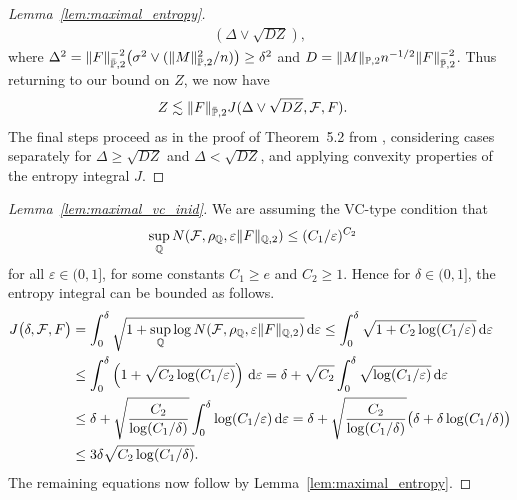 \begin{proof}[Lemma~\ref{lem:maximal_entropy}]
\begin{align*}
    \left( \Delta \vee \sqrt{DZ} \right),
  \end{align*}
  where
  $\Delta^2 = \|F\|_{\bar\P,2}^{-2}
  \big(\sigma^2 \vee (\|M\|_{\P,2}^2 / n) \big) \geq \delta^2$
  and
  $D = \|M\|_{\P,2} n^{-1/2} \|F\|_{\bar\P,2}^{-2}$.
  Thus returning to our bound on $Z$,
  we now have
  \begin{align*}
    Z
    &\lesssim
    \|F\|_{\bar\P,2}
    J(\Delta \vee \sqrt{DZ}, \cF, F).
  \end{align*}
  The final steps proceed as
  in the proof of Theorem~5.2
  from \citet{chernozhukov2014gaussian},
  considering cases separately for
  $\Delta \geq \sqrt{DZ}$
  and
  $\Delta < \sqrt{DZ}$,
  and applying convexity properties of
  the entropy integral $J$.
\end{proof}

\begin{proof}[Lemma~\ref{lem:maximal_vc_inid}]

  We are assuming the VC-type condition that
  \begin{align*}
    \sup_\Q N(\cF, \rho_\Q, \varepsilon \|F\|_{\Q,2})
    &\leq
    (C_1/\varepsilon)^{C_2}
  \end{align*}
  for all $\varepsilon \in (0,1]$,
  for some constants
  $C_1 \geq e$
  and $C_2 \geq 1$.
  Hence for $\delta \in (0,1]$,
  the entropy integral can be bounded as follows.
  \begin{align*}
    J\big(\delta, \cF, F\big)
    &=
    \int_0^\delta
    \sqrt{1 +
    \sup_\Q \log N(\cF, \rho_\Q, \varepsilon \|F\|_{\Q,2})}
    \diff{\varepsilon}
    \leq
    \int_0^\delta
    \sqrt{1 +
      C_2 \log (C_1/\varepsilon)}
    \diff{\varepsilon} \\
    &\leq
    \int_0^\delta
    \left(
      1 +
      \sqrt{C_2 \log (C_1/\varepsilon)}
    \right)
    \diff{\varepsilon}
    =
    \delta
    + \sqrt{C_2}
    \int_0^\delta
    \sqrt{\log (C_1/\varepsilon)}
    \diff{\varepsilon} \\
    &\leq
    \delta
    + \sqrt{\frac{C_2}{\log (C_1/\delta)}}
    \int_0^\delta
    \log (C_1/\varepsilon)
    \diff{\varepsilon}
    =
    \delta
    + \sqrt{\frac{C_2}{\log (C_1/\delta)}}
    \big(
    \delta
    + \delta \log (C_1/\delta)
    \big) \\
    &\leq
    3 \delta
    \sqrt{C_2 \log (C_1/\delta)}.
  \end{align*}
  The remaining equations now follow
  by Lemma~\ref{lem:maximal_entropy}.
\end{proof}

